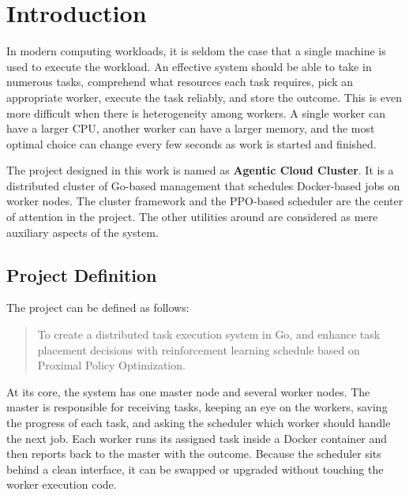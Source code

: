%
%
%

\chapter{Introduction}
\label{section:introduction}

In modern computing workloads, it is seldom the case that a single machine is used to execute the workload. An effective system should be able to take in numerous tasks, comprehend what resources each task requires, pick an appropriate worker, execute the task reliably, and store the outcome. This is even more difficult when there is heterogeneity among workers. A single worker can have a larger CPU, another worker can have a larger memory, and the most optimal choice can change every few seconds as work is started and finished.

The project designed in this work is named as \textbf{Agentic Cloud Cluster}. It is a distributed cluster of Go-based management that schedules Docker-based jobs on worker nodes. The cluster framework and the PPO-based scheduler are the center of attention in the project. The other utilities around are considered as mere auxiliary aspects of the system.

\section{Project Definition}
\label{section:proj_def}

The project can be defined as follows:

\begin{quote}
To create a distributed task execution system in Go, and enhance task placement decisions with reinforcement learning schedule based on Proximal Policy Optimization.
\end{quote}

At its core, the system has one master node and several worker nodes. The master is responsible for receiving tasks, keeping an eye on the workers, saving the progress of each task, and asking the scheduler which worker should handle the next job. Each worker runs its assigned task inside a Docker container and then reports back to the master with the outcome. Because the scheduler sits behind a clean interface, it can be swapped or upgraded without touching the worker execution code.

